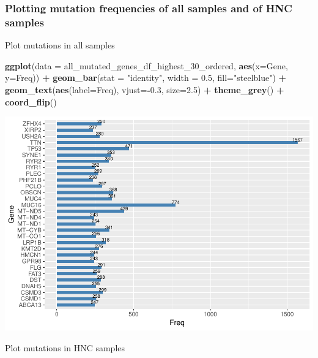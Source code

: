 \documentclass[]{article}
\newenvironment{Shaded}{\begin{snugshade}}{\end{snugshade}}
\newcommand{\KeywordTok}[1]{\textcolor[rgb]{0.13,0.29,0.53}{\textbf{#1}}}
\newcommand{\DataTypeTok}[1]{\textcolor[rgb]{0.13,0.29,0.53}{#1}}
\newcommand{\FloatTok}[1]{\textcolor[rgb]{0.00,0.00,0.81}{#1}}
\newcommand{\StringTok}[1]{\textcolor[rgb]{0.31,0.60,0.02}{#1}}
\newcommand{\OperatorTok}[1]{\textcolor[rgb]{0.81,0.36,0.00}{\textbf{#1}}}
\newcommand{\NormalTok}[1]{#1}
\begin{document}
\subsubsection{Plotting mutation frequencies of all samples and of HNC
samples}\label{plotting-mutation-frequencies-of-all-samples-and-of-hnc-samples}

Plot mutations in all samples

\begin{Shaded}
\begin{Highlighting}[]
\KeywordTok{ggplot}\NormalTok{(}\DataTypeTok{data =}\NormalTok{ all_mutated_genes_df_highest_30_ordered, }\KeywordTok{aes}\NormalTok{(}\DataTypeTok{x=}\NormalTok{Gene, }\DataTypeTok{y=}\NormalTok{Freq)) }\OperatorTok{+}
\StringTok{  }\KeywordTok{geom_bar}\NormalTok{(}\DataTypeTok{stat =} \StringTok{"identity"}\NormalTok{, }\DataTypeTok{width =} \FloatTok{0.5}\NormalTok{, }\DataTypeTok{fill=}\StringTok{"steelblue"}\NormalTok{) }\OperatorTok{+}
\StringTok{  }\KeywordTok{geom_text}\NormalTok{(}\KeywordTok{aes}\NormalTok{(}\DataTypeTok{label=}\NormalTok{Freq), }\DataTypeTok{vjust=}\OperatorTok{-}\FloatTok{0.3}\NormalTok{, }\DataTypeTok{size=}\FloatTok{2.5}\NormalTok{) }\OperatorTok{+}
\StringTok{  }\KeywordTok{theme_grey}\NormalTok{() }\OperatorTok{+}\StringTok{ }\KeywordTok{coord_flip}\NormalTok{()}
\end{Highlighting}
\end{Shaded}

\includegraphics{Project_HNC_files/figure-latex/1_muation_frequency3-1.pdf}

Plot mutations in HNC samples
\end{document}
